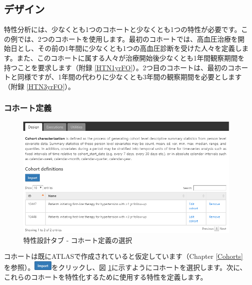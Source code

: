 \documentclass[
  11pt]{book}
\theoremstyle{definition}
\theoremstyle{definition}
\theoremstyle{definition}
\theoremstyle{definition}
\theoremstyle{remark}
\begin{document}
\subsection{デザイン}\label{ux30c7ux30b6ux30a4ux30f3}

特性分析には、少なくとも1つのコホートと少なくとも1つの特性が必要です。この例では、2つのコホートを使用します。最初のコホートでは、高血圧治療を開始日とし、その前の1年間に少なくとも1つの高血圧診断を受けた人々を定義します。また、このコホートに属する人々が治療開始後少なくとも1年間観察期間を持つことを要求します（附録 \ref{HTN1yrFO}）。2つ目のコホートは、最初のコホートと同様ですが、1年間の代わりに少なくとも3年間の観察期間を必要とします（附録 \ref{HTN3yrFO}）。

\subsubsection*{コホート定義}\label{ux30b3ux30dbux30fcux30c8ux5b9aux7fa9}

\begin{figure}

{\centering \includegraphics[width=1\linewidth]{images/Characterization/atlasCharacterizationCohortSelection} 

}

\caption{特性設計タブ - コホート定義の選択}\label{fig:atlasCharacterizationCohortSelection}
\end{figure}

コホートは既にATLASで作成されていると仮定しています（Chapter \ref{Cohorts}を参照）。\includegraphics{images/Characterization/atlasImportButton.png}をクリックし、図 \ref{fig:atlasCharacterizationCohortSelection}に示すようにコホートを選択します。次に、これらのコホートを特性化するために使用する特性を定義します。
\end{document}

